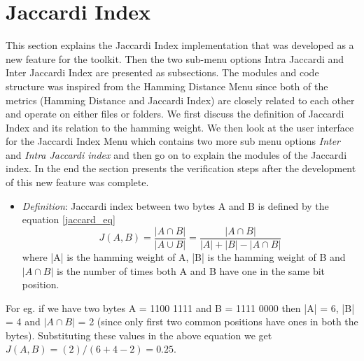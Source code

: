 \section{Jaccardi Index}
\label{jaccardi_index_section}
This section explains the Jaccardi Index implementation that was developed as a new feature for the toolkit. Then the two sub-menu options Intra Jaccardi and Inter Jaccardi Index are presented as subsections.
The modules and code structure was inspired from the Hamming Distance Menu since both of the metrics (Hamming Distance and Jaccardi Index) are closely related to each other and operate on either files or folders. We first discuss the definition of Jaccardi Index and its relation to the hamming weight. We then look at the user interface for the Jaccardi Index Menu which contains two more sub
menu options \emph{Inter} and \emph{Intra Jaccardi index} and then go on to explain the modules of the Jaccardi index. In the end the section presents the verification steps after the development of this new feature was complete.\\

\begin{itemize}
	\item \emph{Definition}: Jaccardi index between two bytes A and B is defined by the equation \ref{jaccard_eq}
	\begin{equation}
	J(A,B) = \frac {|A \cap B|} {|A\cup B|} = \frac{|A \cap B|} {|A| + |B| - |A \cap B|}
	\label{jaccard_eq}
	\end{equation}
	where |A| is the hamming weight of A, |B| is the hamming weight of B and $|A \cap B|$ is the number of times both A and B have one in the same bit position.
\end{itemize}

For eg. if we have two bytes A = 1100 1111 and B = 1111 0000 then |A| = 6, |B| = 4 and $|A \cap B|$ = 2 (since only first two common positions have ones in both the bytes). Substituting these values in the above equation we get $J(A,B) = (2) / ( 6 + 4 - 2) = 0.25$.\\

